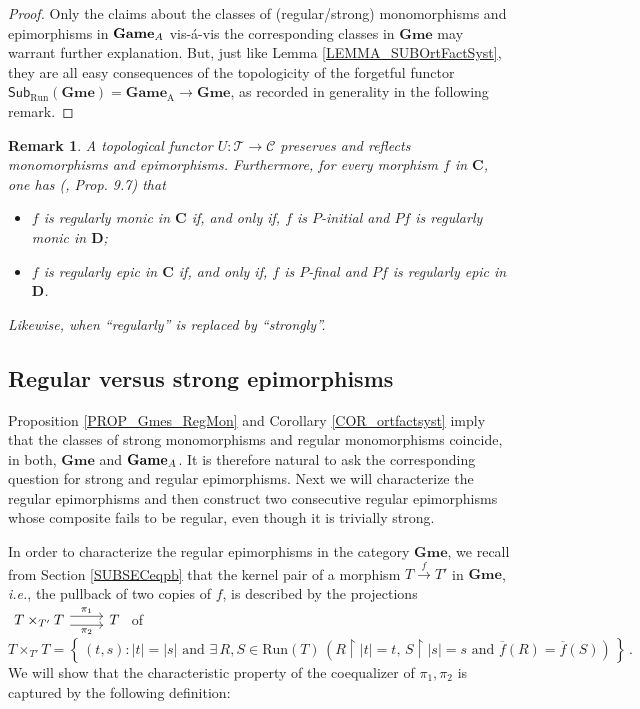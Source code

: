 \documentclass[12pt]{amsart}
\newtheorem{remark}[thm]{Remark}
\theoremstyle{definition}
\newcommand{\set}[1]{\left\{\, {#1} \,\right\}}
\newcommand{\A}{\textup{\textmd{\textsc{A}}}}
\newcommand{\Run}{{\mathrm{Run}}}
\DeclareMathOperator{\restrict}{\upharpoonright}
\newcommand{\Games}{\mathbf{Game}}
\newcommand{\Gmes}{\mathbf{Gme}}
\begin{document}
\begin{proof}
	Only the claims about the classes of (regular/strong) monomorphisms and epimorphisms in $\Games_{\A}$ vis-\'{a}-vis the corresponding classes in $\Gmes$ may warrant further explanation. But, just like Lemma \ref{LEMMA_SUBOrtFactSyst}, they are all easy consequences of the topologicity of the forgetful functor $\mathsf{Sub}_{\mathrm{Run}}(\Gmes)=\Games_{\mathrm A}\longrightarrow\Gmes$, as recorded in generality in the following remark.
\end{proof}

\begin{remark}\label{REM_topfun_RegEpi_StrEpi}
	A topological functor $U:\mathcal T\to\mathcal C$ preserves and reflects monomorphisms and epimorphisms. Furthermore, for every morphism $f$ in $\mathbf C$, one has (\cite{Tholen1974}, Prop. 9.7) that
	\begin{itemize}
		\item $f$ is regularly monic in $\mathbf C$ if, and only if, $f$ is $P$-initial and $Pf$ is regularly monic in $\mathbf D$;
		\item $f$ is regularly epic in $\mathbf C$ if, and only if, $f$ is $P$-final and $Pf$ is regularly epic in $\mathbf D$.	
	\end{itemize}
	Likewise, when ``regularly'' is replaced by ``strongly''.
\end{remark}


\subsection{Regular versus strong epimorphisms}
Proposition \ref{PROP_Gmes_RegMon} and Corollary \ref{COR_ortfactsyst} imply that the classes of strong monomorphisms and regular monomorphisms coincide, in both, $\Gmes$ and $\Games_{\A}$. It is therefore natural to ask the corresponding question for strong and regular epimorphisms. Next we will characterize the regular epimorphisms and then construct two consecutive regular epimorphisms whose composite fails to be regular, even though it is trivially strong.  

In order to characterize the regular epimorphisms in the category $\Gmes$, we recall from Section \ref{SUBSECeqpb} that the kernel pair of a morphism $T\stackrel{f}{\to} T'$ in  $\Gmes$, {\em i.e.}, the pullback of two copies of $f$, 
is described by the projections
$\begin{tikzcd}
	T\times_{T'} T \arrow[r,shift left=.75ex,"\pi_1"] \arrow[r,shift right=.75ex,"\pi_2"{below}]  &	T
\end{tikzcd}$ of 
\[
T\times_{T'} T = \set{(t,s):|t|=|s| \text{ and }\exists\, R,S\in \Run(T)\, (R\restrict|t| = t, \, S\restrict |s| = s \text{ and }\overline{f}(R)=\overline{f}(S))}\,.
\]
We will show that the characteristic property of the coequalizer of $\pi_1,\pi_2$ is captured by the following definition:
\end{document}
